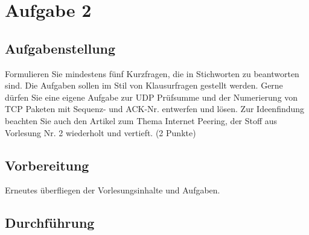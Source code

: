 \section{Aufgabe 2}

\subsection{Aufgabenstellung}
Formulieren Sie mindestens fünf Kurzfragen, die in Stichworten zu beantworten sind. Die Aufgaben sollen im Stil von Klausurfragen gestellt werden. Gerne dürfen Sie eine eigene Aufgabe zur UDP Prüfsumme und der Numerierung von TCP Paketen mit Sequenz- und ACK-Nr. entwerfen und lösen. Zur Ideenfindung beachten Sie auch den Artikel zum Thema Internet Peering, der Stoff aus Vorlesung Nr. 2 wiederholt und vertieft. (2 Punkte)

\subsection{Vorbereitung}
Erneutes überfliegen der Vorlesungsinhalte und Aufgaben.

\subsection{Durchführung}

